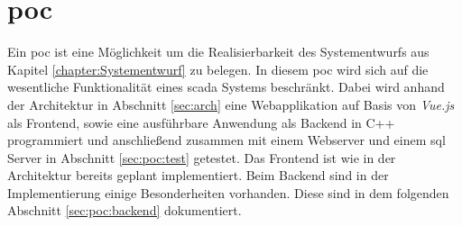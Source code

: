 \chapter{\acl{poc}}
Ein \ac{poc} ist eine Möglichkeit um die Realisierbarkeit des Systementwurfs aus Kapitel \ref{chapter:Systementwurf} zu belegen.
In diesem  \ac{poc} wird sich auf die wesentliche Funktionalität eines \ac{scada} Systems beschränkt.
Dabei wird anhand der Architektur in Abschnitt \ref{sec:arch} eine Webapplikation auf Basis von \emph{Vue.js} als Frontend, 
sowie eine ausführbare Anwendung als Backend in C++ programmiert und anschließend zusammen mit einem Webserver und einem \ac{sql} Server in Abschnitt \ref{sec:poc:test} getestet.
Das Frontend ist wie in der Architektur bereits geplant implementiert. Beim Backend sind in der Implementierung einige Besonderheiten vorhanden.
Diese sind in dem folgenden Abschnitt \ref{sec:poc:backend} dokumentiert.


%
